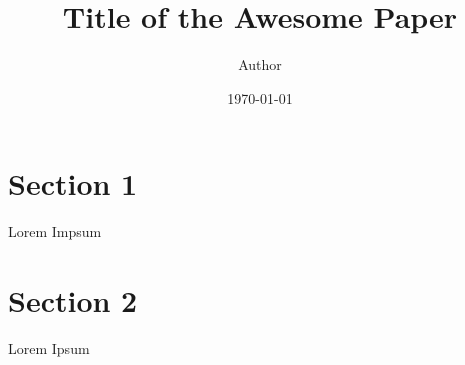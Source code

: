 \documentclass[11pt]{article}
\title{ Title of the Awesome Paper}
\author{ Author }
\date{\today}
\begin{document}
	\maketitle	
	\pagebreak
	
	
	
	\section{Section 1}
	
	Lorem Impsum
	
	
	\pagebreak
	\section{Section 2}
	Lorem Ipsum \\
	
	
\end{document}
